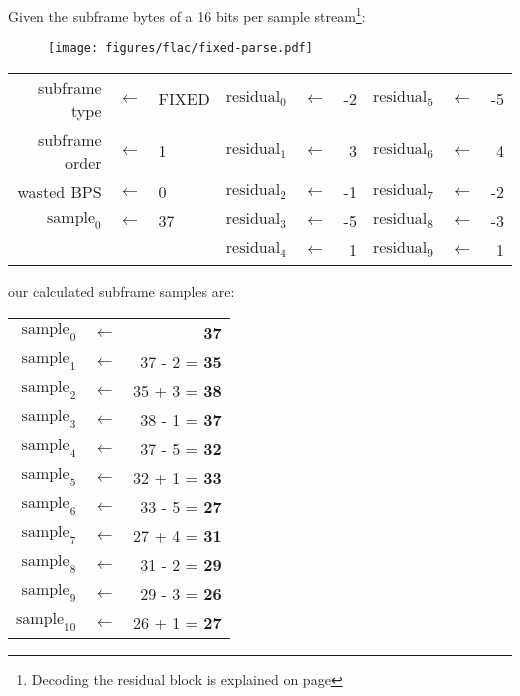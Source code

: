 Given the subframe bytes of a 16 bits per sample stream\footnote{Decoding the residual block is explained on page \pageref{residual_decoding_example}}:
\begin{figure}[h]
\texttt{[image: figures/flac/fixed-parse.pdf]}
\end{figure}
\par
\noindent
\begin{tabular}{rcl|rcr|rcr}
subframe type & $\leftarrow$ & FIXED &
$\text{residual}_0$ & $\leftarrow$ & -2 &
$\text{residual}_5$ & $\leftarrow$ & -5 \\
subframe order & $\leftarrow$ & 1 &
$\text{residual}_1$ & $\leftarrow$ & 3 &
$\text{residual}_6$ & $\leftarrow$ & 4 \\
wasted BPS & $\leftarrow$ & 0 &
$\text{residual}_2$ & $\leftarrow$ & -1 &
$\text{residual}_7$ & $\leftarrow$ & -2 \\
$\text{sample}_0$ & $\leftarrow$ & 37 &
$\text{residual}_3$ & $\leftarrow$ & -5 &
$\text{residual}_8$ & $\leftarrow$ & -3 \\
& & &
$\text{residual}_4$ & $\leftarrow$ & 1 &
$\text{residual}_9$ & $\leftarrow$ & 1 \\
\end{tabular}
\par
\noindent
our calculated subframe samples are:
\par
\noindent
\begin{tabular}{rcr}
$\text{sample}_0$ & $\leftarrow$ & \textbf{37} \\
$\text{sample}_1$ & $\leftarrow$ & 37 - 2 = \textbf{35} \\
$\text{sample}_2$ & $\leftarrow$ & 35 + 3 = \textbf{38} \\
$\text{sample}_3$ & $\leftarrow$ & 38 - 1 = \textbf{37} \\
$\text{sample}_4$ & $\leftarrow$ & 37 - 5 = \textbf{32} \\
$\text{sample}_5$ & $\leftarrow$ & 32 + 1 = \textbf{33} \\
$\text{sample}_6$ & $\leftarrow$ & 33 - 5 = \textbf{27} \\
$\text{sample}_7$ & $\leftarrow$ & 27 + 4 = \textbf{31} \\
$\text{sample}_8$ & $\leftarrow$ & 31 - 2 = \textbf{29} \\
$\text{sample}_9$ & $\leftarrow$ & 29 - 3 = \textbf{26} \\
$\text{sample}_{10}$ & $\leftarrow$ & 26 + 1 = \textbf{27} \\
\end{tabular}

